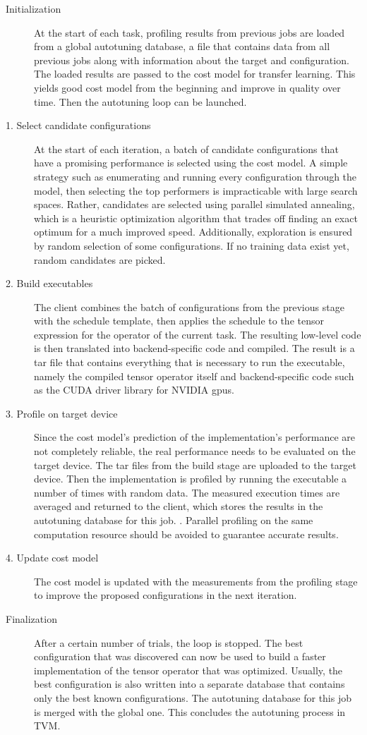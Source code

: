 \begin{description}
	\item[Initialization] At the start of each task, profiling results from previous jobs are loaded from a global autotuning database, a file that contains data from all previous jobs along with information about the target and configuration. The loaded results are passed to the cost model for transfer learning. This yields good cost model from the beginning and improve in quality over time. Then the autotuning loop can be launched.
	\item[1. Select candidate configurations] At the start of each iteration, a batch of candidate configurations that have a promising performance is selected using the cost model. A simple strategy such as enumerating and running every configuration through the model, then selecting the top performers is impracticable with large search spaces. Rather, candidates are selected using parallel simulated annealing, which is a heuristic optimization algorithm that trades off finding an exact optimum for a much improved speed. Additionally, exploration is ensured by random selection of some configurations. If no training data exist yet, random candidates are picked.
	\item[2. Build executables] The client combines the batch of configurations from the previous stage with the schedule template, then applies the schedule to the tensor expression for the operator of the current task. The resulting low-level code is then translated into backend-specific code and compiled. The result is a tar file that contains everything that is necessary to run the executable, namely the compiled tensor operator itself and backend-specific code such as the CUDA driver library for NVIDIA \glspl{gpu}.
	\item[3. Profile on target device] Since the cost model's prediction of the implementation's performance are not completely reliable, the real performance needs to be evaluated on the target device. The tar files from the build stage are uploaded to the target device. Then the implementation is profiled by running the executable a number of times with random data. The measured execution times are averaged and returned to the client, which stores the results in the autotuning database for this job.
	. Parallel profiling on the same computation resource should be avoided to guarantee accurate results.
	\item[4. Update cost model] The cost model is updated with the measurements from the profiling stage to improve the proposed configurations in the next iteration. 
	\item[Finalization] After a certain number of trials, the loop is stopped. The best configuration that was discovered can now be used to build a faster implementation of the tensor operator that was optimized. Usually, the best configuration is also written into a separate database that contains only the best known configurations. The autotuning database for this job is merged with the global one. This concludes the autotuning process in TVM.
\end{description}

